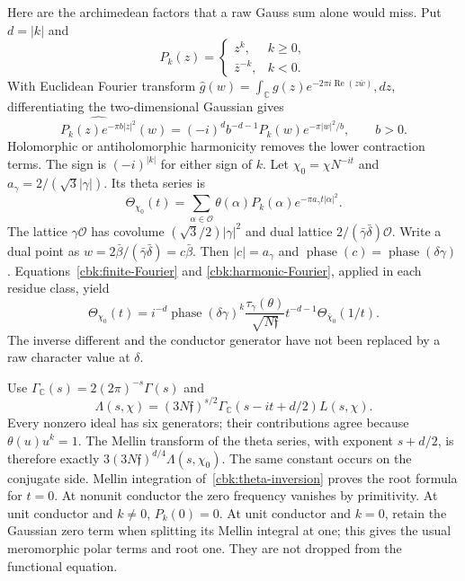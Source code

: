 Here are the archimedean factors that a raw Gauss sum alone would miss.
Put $d=|k|$ and
\[
 P_k(z)=\begin{cases}z^k,&k\ge0,\\\bar z^{-k},&k<0.\end{cases}
\]
With Euclidean Fourier transform
$\widehat g(w)=\int_{\mathbb C}g(z)e^{-2\pi i\operatorname{Re}(z\bar w)},dz$,
differentiating the two-dimensional Gaussian gives
\begin{equation}\label{cbk:harmonic-Fourier}
 \widehat{P_k(z)e^{-\pi b|z|^2}}(w)
    =(-i)^d b^{-d-1}P_k(w)e^{-\pi|w|^2/b},\qquad b>0.
\end{equation}
Holomorphic or antiholomorphic harmonicity removes the lower
contraction terms. The sign is $(-i)^{|k|}$ for either sign of $k$.
Let $\chi_0=\chi N^{-it}$ and
$a_\gamma=2/(\sqrt3|\gamma|)$. Its theta series is
\[
 \Theta_{\chi_0}(t)=\sum_{\alpha\in\mathcal O}
          \theta(\alpha)P_k(\alpha)e^{-\pi a_\gamma t|\alpha|^2}.
\]
The lattice $\gamma\mathcal O$ has covolume
$(\sqrt3/2)|\gamma|^2$ and dual lattice
$2/(\bar\gamma\bar\delta)\mathcal O$.
Write a dual point as $w=2\bar\beta/(\bar\gamma\bar\delta)=c\bar\beta$.
Then $|c|=a_\gamma$ and
$\operatorname{phase}(c)=\operatorname{phase}(\delta\gamma)$.
Equations~\eqref{cbk:finite-Fourier} and
\eqref{cbk:harmonic-Fourier}, applied in each residue class, yield
\begin{equation}\label{cbk:theta-inversion}
 \Theta_{\chi_0}(t)=i^{-d}\operatorname{phase}(\delta\gamma)^k
      \frac{\tau_\gamma(\theta)}{\sqrt{N\mathfrak f}}
                 t^{-d-1}\Theta_{\bar\chi_0}(1/t).
\end{equation}
The inverse different and the conductor generator have not been
replaced by a raw character value at $\delta$.

Use $\Gamma_{\mathbb C}(s)=2(2\pi)^{-s}\Gamma(s)$ and
\[
 \Lambda(s,\chi)=(3N\mathfrak f)^{s/2}
           \Gamma_{\mathbb C}(s-it+d/2)L(s,\chi).
\]
Every nonzero ideal has six generators; their contributions agree
because $\theta(u)u^k=1$. The Mellin transform of the theta series,
with exponent $s+d/2$, is therefore exactly
$3(3N\mathfrak f)^{d/4}\Lambda(s,\chi_0)$.
The same constant occurs on the conjugate side. Mellin integration
of~\eqref{cbk:theta-inversion} proves the root formula for $t=0$.
At nonunit conductor the zero frequency vanishes by primitivity.
At unit conductor and $k\ne0$, $P_k(0)=0$. At unit conductor and
$k=0$, retain the Gaussian zero term when splitting its Mellin
integral at one; this gives the usual meromorphic polar terms and
root one. They are not dropped from the functional equation.

